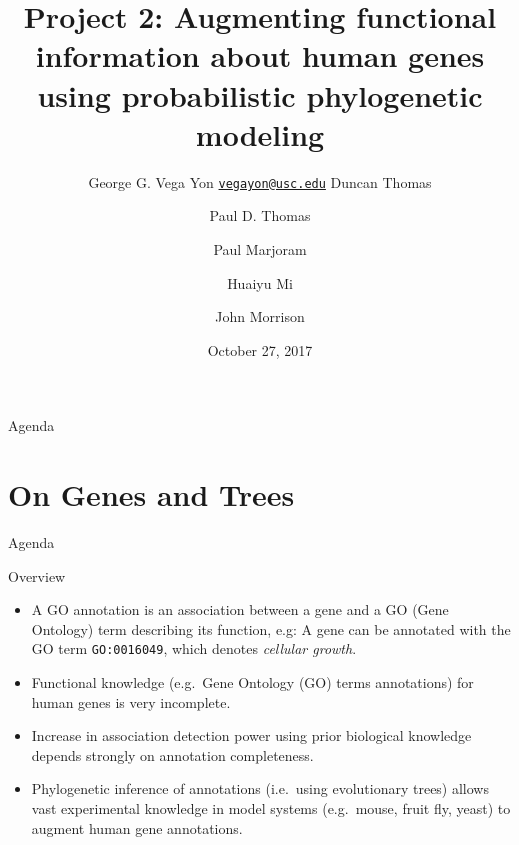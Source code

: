 \documentclass[9pt,ignorenonframetext,aspectratio=169]{beamer}
\title{Project 2: Augmenting functional information about human genes using
probabilistic phylogenetic modeling}
\author[
Vega Yon
]{George G. Vega Yon
\linebreak[4] \href{mailto:vegayon@usc.edu}{\nolinkurl{vegayon@usc.edu}}
\linebreak[4] \footnotesize Duncan Thomas \and Paul D. Thomas \and Paul
Marjoram \and Huaiyu Mi \and John Morrison \normalsize}
\institute[USC]{Department of Preventive Medicine \linebreak[4] University of Southern
California}
\date{October 27, 2017}
\begin{document}
{


\begin{frame}
\titlepage
\end{frame}

}

\begin{frame}{Agenda}

\tableofcontents{}

\end{frame}

\section{On Genes and Trees}\label{on-genes-and-trees}

\begin{frame}{Agenda}

\tableofcontents[currentsection]

\end{frame}

\begin{frame}[fragile]{Overview}

\begin{itemize}
\item
  A GO annotation is an association between a gene and a GO (Gene
  Ontology) term describing its function, e.g: A gene can be annotated
  with the GO term \texttt{GO:0016049}, which denotes \emph{cellular
  growth}.\pause
\item
  Functional knowledge (e.g.~Gene Ontology (GO) terms annotations) for
  human genes is very incomplete.\pause
\item
  Increase in association detection power using prior biological
  knowledge depends strongly on annotation completeness.\pause
\item
  Phylogenetic inference of annotations (i.e.~using evolutionary trees)
  allows vast experimental knowledge in model systems (e.g.~mouse, fruit
  fly, yeast) to augment human gene annotations.
\end{itemize}

\end{frame}
\end{document}
